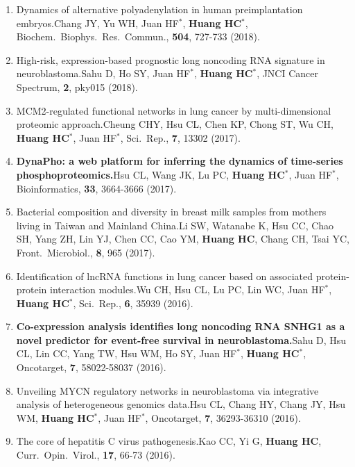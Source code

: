\documentclass[10pt,a4paper]{article}
\def\mypub#1#2#3{{#1.}\newline #2, #3.}
\def\mybpub#1#2#3{{\boldmath \bf #1.}\newline #2, #3.}
\def\cited#1{Cited $\ge$ #1}
\begin{document}
\begin{enumerate}
\item 
\mypub{Dynamics of alternative polyadenylation in human preimplantation embryos}
{Chang JY, Yu WH, Juan HF$^*$, {\bf Huang HC$^*$}}
{Biochem.\ Biophys.\ Res.\ Commun., {\bf 504}, 727-733 (2018)}

\item
\mypub{High-risk, expression-based prognostic long noncoding RNA signature in neuroblastoma}
{Sahu D, Ho SY, Juan HF$^*$, {\bf Huang HC$^*$}}
{JNCI Cancer Spectrum, {\bf 2}, pky015 (2018)}


\item
\mypub{MCM2-regulated functional networks in lung cancer by multi-dimensional proteomic approach}
{Cheung CHY, Hsu CL, Chen KP, Chong ST, Wu CH, {\bf Huang HC$^*$}, Juan HF$^*$}
{Sci.\ Rep., {\bf 7}, 13302 (2017)}

\item
\mybpub{DynaPho: a web platform for inferring the dynamics of time-series phosphoproteomics}
{Hsu CL, Wang JK, Lu PC, {\bf Huang HC$^*$}, Juan HF$^*$}
{Bioinformatics, {\bf 33}, 3664-3666  (2017)}

\item
\mypub{Bacterial composition and diversity in breast milk samples from mothers living in Taiwan and Mainland China}
{Li SW, Watanabe K, Hsu CC, Chao SH, Yang ZH, Lin YJ, Chen CC, Cao YM, {\bf Huang HC}, Chang CH, Tsai YC}
{Front.\ Microbiol., {\bf 8}, 965 (2017)}

\item
\mypub{Identification of lncRNA functions in lung cancer based on associated protein-protein interaction modules}
{Wu CH, Hsu CL, Lu PC, Lin WC, Juan HF$^*$, {\bf Huang HC$^*$}}
{Sci.\ Rep., {\bf 6}, 35939 (2016)}

\item
\mybpub{Co-expression analysis identifies long noncoding RNA SNHG1 as a novel predictor for event-free survival in neuroblastoma}
{Sahu D, Hsu CL, Lin CC, Yang TW, Hsu WM, Ho SY, Juan HF$^*$, {\bf Huang HC$^*$}}
{Oncotarget, {\bf 7}, 58022-58037 (2016)}

\item
\mypub{Unveiling MYCN regulatory networks in neuroblastoma via integrative analysis of heterogeneous genomics data}
{Hsu CL, Chang HY, Chang JY, Hsu WM, {\bf Huang HC$^*$}, Juan HF$^*$}
{Oncotarget, {\bf 7}, 36293-36310 (2016)}

\item
\mypub{The core of hepatitis C virus pathogenesis}
{Kao CC, Yi G, {\bf Huang HC}}
{Curr.\ Opin.\ Virol., {\bf 17}, 66-73 (2016)}


\end{enumerate}
\end{document}
